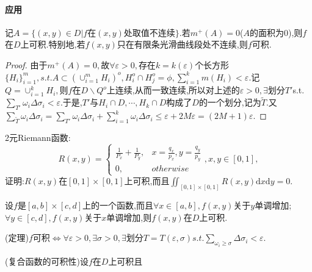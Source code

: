 \documentclass[UTF8]{ctexart}
\renewcommand{\d}{\mathrm{d}}
\begin{document}
    \paragraph{应用}记$A=\{(x,y)\in D|f\text{在}(x,y)\text{处取值不连续}\}$.若$m^+(A)=0$($A$的面积为0),则$f$在$D$上可积.特别地,若$f(x,y)$只在有限条光滑曲线段处不连续,则$f$可积.
    \begin{proof}
        由于$m^+(A)=0,$故$\forall\varepsilon>0,$存在$k=k(\varepsilon)$个长方形$\{H_i\}_{i=1}^m,s.t.A\subset\left(\cup_{i=1}^mH_i\right)^o,H^o_i\cap H^o_j=\phi,\sum_{i=1}^km(H_i)<\varepsilon$.记$Q=\cup_{i=1}^kH_i,$则$f$在$D\backslash Q^o$上连续,从而一致连续,所以对上述的$\varepsilon>0,\exists$划分$T'$s.t.$\sum_{T'}\omega_i\Delta\sigma_i<\varepsilon$.于是,$T'$与$H_i\cap D,\cdots,H_k\cap D$构成了$D$的一个划分,记为$\tilde{T}$.又$\sum_{\tilde{T}}\omega_i\Delta\sigma_i=\sum_{T'}\omega_i\Delta\sigma_i+\sum_{i=1}^k\omega_i\Delta\sigma_i\le\varepsilon+2M\varepsilon=(2M+1)\varepsilon$.
    \end{proof}

    2元Riemann函数:
    $$R(x,y)=\begin{cases}
        \frac{1}{P_x}+\frac{1}{P_y},&x=\frac{q_x}{p_x},y=\frac{q_y}{p_y}\\
        0,&otherwise
    \end{cases},x,y\in[0,1],$$
    证明:$R(x,y)$在$[0,1]\times[0,1]$上可积,而且$\iint_{[0,1]\times[0,1]}R(x,y)\d x\d y=0$.

    设$f$是$[a,b]\times[c,d]$上的一个函数,而且$\forall x\in[a,b],f(x,y)$关于$y$单调增加;$\forall y\in[c,d],f(x,y)$关于$x$单调增加,则$f(x,y)$在$D$上可积.

    (定理)$f$可积$\Leftrightarrow\forall\varepsilon>0,\exists\sigma>0,\exists$划分$T=T(\varepsilon,\sigma)s.t.\sum_{\omega_i\ge\sigma}\Delta\sigma_i<\varepsilon$.

    (复合函数的可积性)设$f$在$D$上可积且
\end{document}
